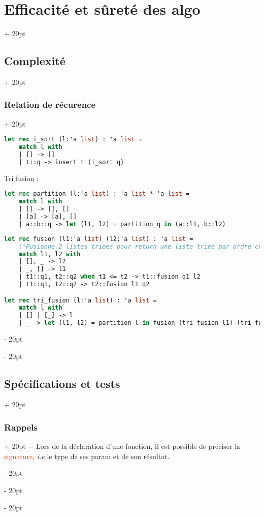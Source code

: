 \documentclass[a4paper, 12pt, twoside]{article}
\renewcommand{\emph}{\textcolor{ff4500}}
\newcommand{\ind}[1][20pt]{\advance\leftskip + #1}
\newcommand{\deind}[1][20pt]{\advance\leftskip - #1}
\newenvironment{indentedenv}[1][20pt]{\par \ind[#1]}{\par \deind}
\newenvironment{indt}[2][20pt]{#2 \begin{indentedenv}[#1]}{\end{indentedenv}} %
\begin{document}
\begin{indt}{\section{Efficacité et sûreté des algo}}
\begin{indt}{\subsection{Complexité}}
\begin{indt}{\subsubsection{Relation de récurence}}
\begin{lstlisting}[language=Caml, xleftmargin=80pt]
let rec i_sort (l:'a list) : 'a list =
    match l with
    | [] -> []
    | t::q -> insert t (i_sort q)
                \end{lstlisting}
                
                \vspace{12pt}
                
                Tri fusion :
                
                \begin{lstlisting}[language=Caml, xleftmargin=80pt]
let rec partition (l:'a list) : 'a list * 'a list =
    match l with
    | [] -> [], []
    | [a] -> [a], []
    | a::b::q -> let (l1, l2) = partition q in (a::l1, b::l2)

                \end{lstlisting}
                
                \newpage
                
                \begin{lstlisting}[language=Caml, xleftmargin=80pt]
let rec fusion (l1:'a list) (l2:'a list) : 'a list =
    (*Fusionne 2 listes triees pour return une liste triee par ordre croissant.*)
    match l1, l2 with
    | [], _ -> l2
    | _, [] -> l1
    | t1::q1, t2::q2 when t1 <= t2 -> t1::fusion q1 l2
    | t1::q1, t2::q2 -> t2::fusion l1 q2

let rec tri_fusion (l:'a list) : 'a list =
    match l with
    | [] | [_] -> l
    | _ -> let (l1, l2) = partition l in fusion (tri fusion l1) (tri_fusion l2)
                \end{lstlisting}
                
            \end{indt}
            
        \end{indt}
        
        \vspace{12pt}
        
        \begin{indt}{\subsection{Spécifications et tests}}
            
            \begin{indt}{\subsubsection{Rappels}}
                $-$ Lors de la déclaration d'une fonction, il est possible de préciser la \emph{signature}, \textit{i.e} le type de ses param et de son résultat.
                

\end{indt}
\end{indt}
\end{indt}
\end{document}
